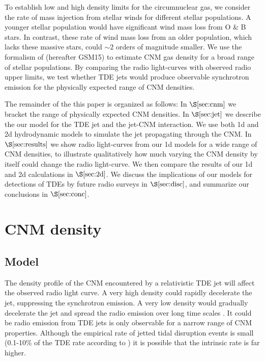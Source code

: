 \documentclass[usenatbib,fleqn]{mn2e}
\begin{document}
To establish low and high density limits for the circumnuclear gas, we
consider the rate of mass injection from stellar winds for different
stellar populations. A younger stellar population would have
significant wind mass loss from O \& B stars. In contrast, these rate
of wind mass loss from an older population, which lacks these massive
stars, could $\sim 2$ orders of magnitude smaller. We use the
formalism of \citet{Generozov+2015} (hereafter GSM15) to estimate CNM
gas density for a broad range of stellar populations. By comparing the
radio light-curves with observed radio upper limits, we test whether
TDE jets would produce observable synchrotron emission for the
physically expected range of CNM densities.

The remainder of the this paper is organized as follows: In
$\S\ref{sec:cnm}$ we bracket the range of physically expected CNM
densities. In $\S\ref{sec:jet}$ we describe the our model for the TDE
jet and the jet-CNM interaction. We use both 1d and 2d hydrodynamic
models to simulate the jet propagating through the CNM. In
$\S\ref{sec:results}$ we show radio light-curves from our 1d models
for a wide range of CNM densities, to illustrate qualitatively how
much varying the CNM density by itself could change the radio
light-curve. We then compare the results of our 1d and 2d calculations
in $\S\ref{sec:2d}$. We discuss the implications of our models for
detections of TDEs by future radio surveys in $\S\ref{sec:disc}$, and
summarize our conclusions in $\S\ref{sec:conc}$.

\section{CNM density}
\label{sec:cnm}

\subsection{Model}

The density profile of the CNM encountered by a relativistic TDE jet
will affect the observed radio light curve. A very high density could
rapidly decelerate the jet, suppressing the synchrotron emission. A
very low density would gradually decelerate the jet and spread the
radio emission over long time scales \citep{Mimica+2015}.  It could be 
radio emission from TDE jets is only observable for a narrow range of
CNM properties. Although the empirical rate of jetted tidal disruption
events is small (0.1-10\% of the TDE rate according to
\citealt{van-Velzen+2013}) it is possible that the intrinsic rate is
far higher.
\end{document}
